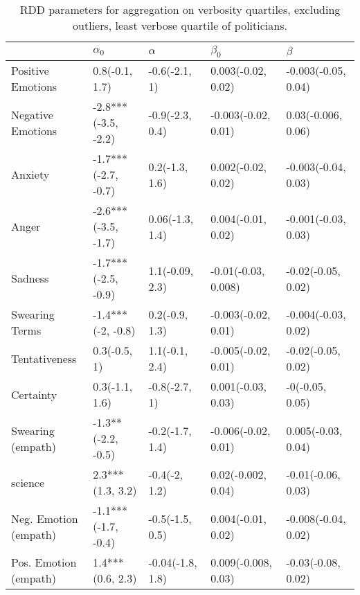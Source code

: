 \begin{table}[h]\centering
\begin{adjustbox}{width=\linewidth, center}
	\begin{tabular}{lllll}
	\toprule
	{} &           $\alpha_0$ &          $\alpha$ &            $\beta_0$ &              $\beta$ \\
	\midrule
	Positive Emotions     &       0.8(-0.1, 1.7) &     -0.6(-2.1, 1) &   0.003(-0.02, 0.02) &  -0.003(-0.05, 0.04) \\
	Negative Emotions     &  -2.8***(-3.5, -2.2) &   -0.9(-2.3, 0.4) &  -0.003(-0.02, 0.01) &   0.03(-0.006, 0.06) \\
	Anxiety               &  -1.7***(-2.7, -0.7) &    0.2(-1.3, 1.6) &   0.002(-0.02, 0.02) &  -0.003(-0.04, 0.03) \\
	Anger                 &  -2.6***(-3.5, -1.7) &   0.06(-1.3, 1.4) &   0.004(-0.01, 0.02) &  -0.001(-0.03, 0.03) \\
	Sadness               &  -1.7***(-2.5, -0.9) &   1.1(-0.09, 2.3) &  -0.01(-0.03, 0.008) &   -0.02(-0.05, 0.02) \\
	Swearing Terms        &    -1.4***(-2, -0.8) &    0.2(-0.9, 1.3) &  -0.003(-0.02, 0.01) &  -0.004(-0.03, 0.02) \\
	Tentativeness         &         0.3(-0.5, 1) &    1.1(-0.1, 2.4) &  -0.005(-0.02, 0.01) &   -0.02(-0.05, 0.02) \\
	Certainty             &       0.3(-1.1, 1.6) &     -0.8(-2.7, 1) &   0.001(-0.03, 0.03) &      -0(-0.05, 0.05) \\
	Swearing (empath)     &   -1.3**(-2.2, -0.5) &   -0.2(-1.7, 1.4) &  -0.006(-0.02, 0.01) &   0.005(-0.03, 0.04) \\
	science               &     2.3***(1.3, 3.2) &     -0.4(-2, 1.2) &   0.02(-0.002, 0.04) &   -0.01(-0.06, 0.03) \\
	Neg. Emotion (empath) &  -1.1***(-1.7, -0.4) &   -0.5(-1.5, 0.5) &   0.004(-0.01, 0.02) &  -0.008(-0.04, 0.02) \\
	Pos. Emotion (empath) &     1.4***(0.6, 2.3) &  -0.04(-1.8, 1.8) &  0.009(-0.008, 0.03) &   -0.03(-0.08, 0.02) \\
	\bottomrule
	\end{tabular}
	
\end{adjustbox}
	\caption{RDD parameters for aggregation on verbosity quartiles, excluding outliers, least verbose quartile of politicians.}
	\label{fig: Verbosity_8}
\end{table}

